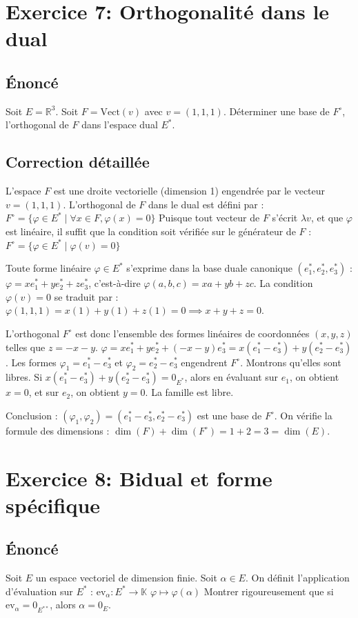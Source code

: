\documentclass{report}
\begin{document}
\newpage
\chapter*{Exercice 7: Orthogonalité dans le dual}
\section*{Énoncé}
Soit $E = \mathbb{R}^3$. Soit $F = \text{Vect}(v)$ avec $v = (1, 1, 1)$.
Déterminer une base de $F^\circ$, l'orthogonal de $F$ dans l'espace dual $E^*$.


\section*{Correction détaillée}
L'espace $F$ est une droite vectorielle (dimension 1) engendrée par le vecteur $v = (1, 1, 1)$.
L'orthogonal de $F$ dans le dual est défini par :
$F^\circ = \{ \varphi \in E^* \mid \forall x \in F, \varphi(x) = 0 \}$
Puisque tout vecteur de $F$ s'écrit $\lambda v$, et que $\varphi$ est linéaire, il suffit que la condition soit vérifiée sur le générateur de $F$ :
$F^\circ = \{ \varphi \in E^* \mid \varphi(v) = 0 \}$

Toute forme linéaire $\varphi \in E^*$ s'exprime dans la base duale canonique $(e_1^*, e_2^*, e_3^*)$ :
$\varphi = x e_1^* + y e_2^* + z e_3^*$, c'est-à-dire $\varphi(a, b, c) = xa + yb + zc$.
La condition $\varphi(v) = 0$ se traduit par :
$\varphi(1, 1, 1) = x(1) + y(1) + z(1) = 0 \implies x + y + z = 0$.

L'orthogonal $F^\circ$ est donc l'ensemble des formes linéaires de coordonnées $(x, y, z)$ telles que $z = -x - y$.
$\varphi = x e_1^* + y e_2^* + (-x - y) e_3^* = x(e_1^* - e_3^*) + y(e_2^* - e_3^*)$.
Les formes $\varphi_1 = e_1^* - e_3^*$ et $\varphi_2 = e_2^* - e_3^*$ engendrent $F^\circ$.
Montrons qu'elles sont libres. Si $x(e_1^* - e_3^*) + y(e_2^* - e_3^*) = 0_{E^*}$, alors en évaluant sur $e_1$, on obtient $x = 0$, et sur $e_2$, on obtient $y = 0$. La famille est libre.

Conclusion : $(\varphi_1, \varphi_2) = (e_1^* - e_3^*, e_2^* - e_3^*)$ est une base de $F^\circ$.
On vérifie la formule des dimensions : $\dim(F) + \dim(F^\circ) = 1 + 2 = 3 = \dim(E)$.


\newpage
\chapter*{Exercice 8: Bidual et forme spécifique}
\section*{Énoncé}
Soit $E$ un espace vectoriel de dimension finie. Soit $\alpha \in E$. On définit l'application d'évaluation sur $E^*$ :
$\text{ev}_\alpha : E^* \to \mathbb{K}$
$\varphi \mapsto \varphi(\alpha)$
Montrer rigoureusement que si $\text{ev}_\alpha = 0_{E^{**}}$, alors $\alpha = 0_E$.
\end{document}
